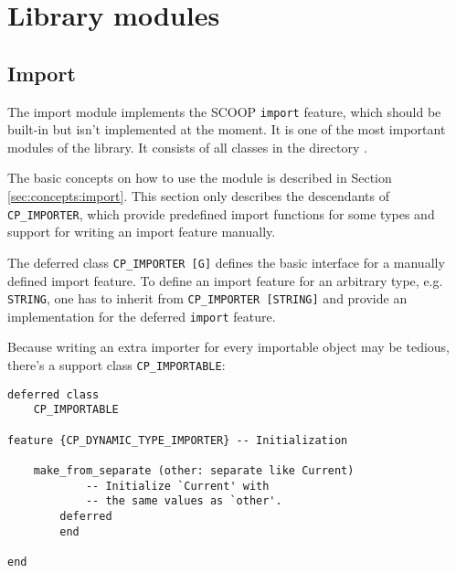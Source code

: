 \section{Library modules}
\label{sec:modules}

\subsection{Import}
\label{sec:modules:import}

The import module implements the SCOOP \lstinline!import! feature, which should be built-in but isn't implemented at the moment.
It is one of the most important modules of the library.
It consists of all classes in the directory .

The basic concepts on how to use the module is described in Section \ref{sec:concepts:import}.
This section only describes the descendants of \lstinline!CP_IMPORTER!, which provide predefined import functions for some types and support for writing an import feature manually.

The deferred class \lstinline!CP_IMPORTER [G]! defines the basic interface for a manually defined import feature.
To define an import feature for an arbitrary type, e.g. \lstinline!STRING!, one has to inherit from \lstinline!CP_IMPORTER [STRING]! and provide an implementation for the deferred \lstinline!import! feature.

% 

Because writing an extra importer for every importable object may be tedious, there's a support class \lstinline!CP_IMPORTABLE!:

\begin{lstlisting}
deferred class
	CP_IMPORTABLE

feature {CP_DYNAMIC_TYPE_IMPORTER} -- Initialization

	make_from_separate (other: separate like Current)
			-- Initialize `Current' with 
			-- the same values as `other'.
		deferred
		end

end
\end{lstlisting}

